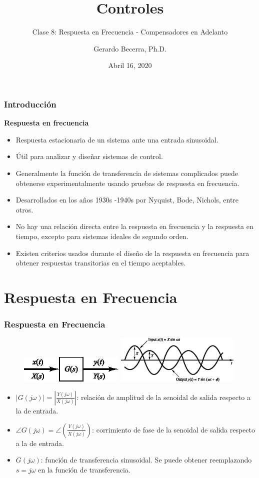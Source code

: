 \documentclass[aspectratio=169]{beamer}
\title{Controles}
\subtitle{\small Clase 8: Respuesta en Frecuencia - Compensadores en Adelanto}
\author{Gerardo Becerra, Ph.D.}
\institute{Pontificia Universidad Javeriana\\ Departamento de Electrónica}
\date{Abril 16, 2020}
\theoremstyle{definition}
\theoremstyle{plain}
\theoremstyle{remark}
\begin{document}
\frame{\titlepage}	

\begin{frame}[<+->]\frametitle{Introducción}
\textbf{Respuesta en frecuencia}
\begin{itemize}
	\item Respuesta estacionaria de un sistema ante una entrada sinusoidal.
	\item Útil para analizar y diseñar sistemas de control.
	\item Generalmente la función de transferencia de sistemas complicados puede obtenerse experimentalmente usando pruebas de respuesta en frecuencia.
	\item Desarrollados en los años 1930s -1940s por Nyquist, Bode, Nichols, entre otros.
	\item No hay una relación directa entre la respuesta en frecuencia y la respuesta en tiempo, excepto para sistemas ideales de segundo orden.
	\item Existen criterios usados durante el diseño de la respuesta en frecuencia para obtener respuestas transitorias en el tiempo aceptables.
\end{itemize}
\end{frame}

\section{Respuesta en Frecuencia}
\begin{frame}[<+->]\frametitle{Respuesta en Frecuencia}
	\begin{figure}
		\includegraphics[width=5cm]{images/SLIT.eps}
		\hspace*{10mm}
		\includegraphics[width=6cm]{images/inputOutputSignals.eps}
	\end{figure}
	\pause
	\begin{itemize}
		\item $\left| G(j\omega) \right| = \left| \frac{Y(j\omega)}{X(j\omega)} \right|$: relación de amplitud de la senoidal de salida respecto a la de entrada.
		\item $\angle G(j\omega) = \angle \left(\frac{Y(j\omega)}{X(j\omega)} \right)$: corrimiento de fase de la senoidal de salida respecto a la de entrada.
		\item $G(j\omega)$: función de transferencia sinusoidal. Se puede obtener reemplazando $s = j\omega$ en la función de transferencia.
	\end{itemize}
\end{frame}
\end{document}

